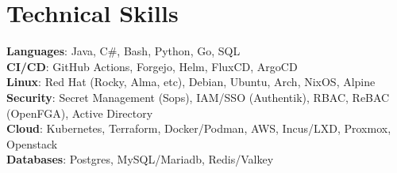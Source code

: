 \documentclass[letterpaper,11pt]{article}
\begin{document}
%
\section{Technical Skills}
 \begin{itemize}[leftmargin=0.15in, label={}]
    \small{\item{
     \textbf{Languages}{: Java, C\#, Bash, Python, Go, SQL} \\
     \textbf{CI/CD}{: GitHub Actions, Forgejo, Helm, FluxCD, ArgoCD} \\
     \textbf{Linux}{: Red Hat (Rocky, Alma, etc), Debian, Ubuntu, Arch, NixOS, Alpine} \\
     \textbf{Security}{: Secret Management (Sops), IAM/SSO (Authentik), RBAC, ReBAC (OpenFGA), Active Directory} \\
     \textbf{Cloud}{: Kubernetes, Terraform, Docker/Podman, AWS, Incus/LXD, Proxmox, Openstack} \\
     \textbf{Databases}{: Postgres, MySQL/Mariadb, Redis/Valkey}
    }}
 \end{itemize}


\end{document}
